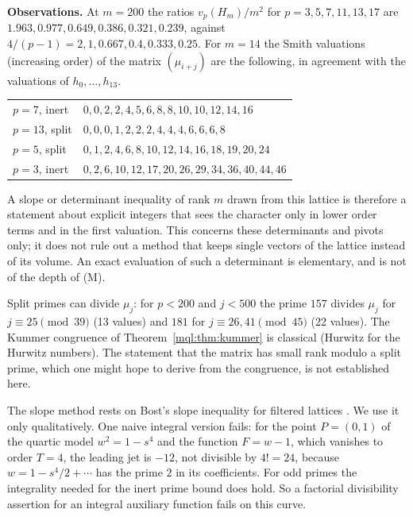 \textbf{Observations.} At $m=200$ the ratios $v_p(H_m)/m^2$ for $p=3,5,7,11,13,17$ are $1.963,0.977,0.649,0.386,0.321,0.239$, against $4/(p-1)=2,1,0.667,0.4,0.333,0.25$. For $m=14$ the Smith valuations (increasing order) of the matrix $(\mu_{i+j})$ are the following, in agreement with the valuations of $h_0,\dots,h_{13}$.
\begin{center}
\begin{tabular}{ll}
\hline
$p=7$, inert & $0,0,2,2,4,5,6,8,8,10,10,12,14,16$\\
$p=13$, split & $0,0,0,1,2,2,2,4,4,4,6,6,6,8$\\
$p=5$, split & $0,1,2,4,6,8,10,12,14,16,18,19,20,24$\\
$p=3$, inert & $0,2,6,10,12,17,20,26,29,34,36,40,44,46$\\
\hline
\end{tabular}
\end{center}

A slope or determinant inequality of rank $m$ drawn from this lattice is therefore a statement about explicit integers that sees the character only in lower order terms and in the first valuation. This concerns these determinants and pivots only; it does not rule out a method that keeps single vectors of the lattice instead of its volume. An exact evaluation of such a determinant is elementary, and is not of the depth of (M).

Split primes can divide $\mu_j$: for $p<200$ and $j<500$ the prime $157$ divides $\mu_j$ for $j\equiv25\pmod{39}$ (13 values) and $181$ for $j\equiv26,41\pmod{45}$ (22 values). The Kummer congruence of Theorem~\ref{mql:thm:kummer} is classical (Hurwitz \cite{Hurwitz99} for the Hurwitz numbers). The statement that the matrix has small rank modulo a split prime, which one might hope to derive from the congruence, is not established here.

\begin{remark}\label{mqg:rem:bost}
The slope method rests on Bost's slope inequality for filtered lattices \cite{Bost95,Bost01}. We use it only qualitatively. One naive integral version fails: for the point $P=(0,1)$ of the quartic model $w^2=1-s^4$ and the function $F=w-1$, which vanishes to order $T=4$, the leading jet is $-12$, not divisible by $4!=24$, because $w=1-s^4/2+\cdots$ has the prime $2$ in its coefficients. For odd primes the integrality needed for the inert prime bound does hold. So a factorial divisibility assertion for an integral auxiliary function fails on this curve.
\end{remark}

